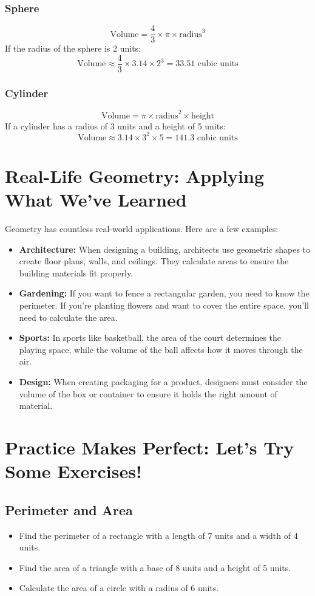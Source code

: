 \subsubsection{Sphere}
\[
\text{Volume} = \frac{4}{3} \times \pi \times \text{radius}^3
\]
If the radius of the sphere is 2 units:
\[
\text{Volume} \approx \frac{4}{3} \times 3.14 \times 2^3 = 33.51 \text{ cubic units}
\]

\subsubsection{Cylinder}
\[
\text{Volume} = \pi \times \text{radius}^2 \times \text{height}
\]
If a cylinder has a radius of 3 units and a height of 5 units:
\[
\text{Volume} \approx 3.14 \times 3^2 \times 5 = 141.3 \text{ cubic units}
\]

\section{Real-Life Geometry: Applying What We’ve Learned}
Geometry has countless real-world applications. Here are a few examples:

\begin{itemize}
    \item \textbf{Architecture:} When designing a building, architects use geometric shapes to create floor plans, walls, and ceilings. They calculate areas to ensure the building materials fit properly.
    \item \textbf{Gardening:} If you want to fence a rectangular garden, you need to know the perimeter. If you’re planting flowers and want to cover the entire space, you’ll need to calculate the area.
    \item \textbf{Sports:} In sports like basketball, the area of the court determines the playing space, while the volume of the ball affects how it moves through the air.
    \item \textbf{Design:} When creating packaging for a product, designers must consider the volume of the box or container to ensure it holds the right amount of material.
\end{itemize}

\section{Practice Makes Perfect: Let’s Try Some Exercises!}
\subsection{Perimeter and Area}
\begin{itemize}
    \item Find the perimeter of a rectangle with a length of 7 units and a width of 4 units.
    \item Find the area of a triangle with a base of 8 units and a height of 5 units.
    \item Calculate the area of a circle with a radius of 6 units.
\end{itemize}

